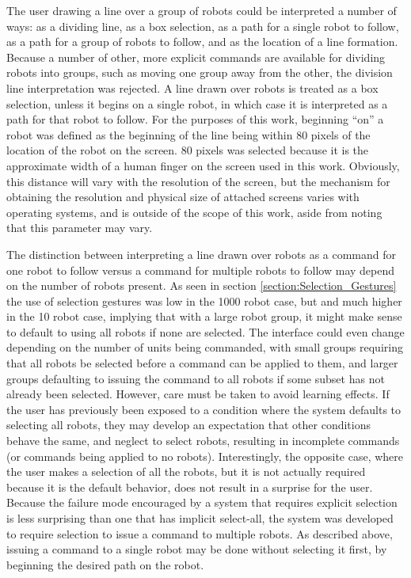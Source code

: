 The user drawing a line over a group of robots could be interpreted a number of ways: as a dividing line, as a box selection, as a path for a single robot to follow, as a path for a group of robots to follow, and as the location of a line formation. 
Because a number of other, more explicit commands are available for dividing robots into groups, such as moving one group away from the other, the division line interpretation was rejected. 
A line drawn over robots is treated as a box selection, unless it begins on a single robot, in which case it is interpreted as a path for that robot to follow. 
For the purposes of this work, beginning ``on'' a robot was defined as the beginning of the line being within 80 pixels of the location of the robot on the screen. 
80 pixels was selected because it is the approximate width of a human finger on the screen used in this work. 
Obviously, this distance will vary with the resolution of the screen, but the mechanism for obtaining the resolution and physical size of attached screens varies with operating systems, and is outside of the scope of this work, aside from noting that this parameter may vary.

The distinction between interpreting a line drawn over robots as a command for one robot to follow versus a command for multiple robots to follow may depend on the number of robots present.
As seen in section \ref{section:Selection_Gestures} the use of selection gestures was low in the 1000 robot case, but and much higher in the 10 robot case, implying that with a large robot group, it might make sense to default to using all robots if none are selected. 
The interface could even change depending on the number of units being commanded, with small groups requiring that all robots be selected before a command can be applied to them, and larger groups defaulting to issuing the command to all robots if some subset has not already been selected. 
However, care must be taken to avoid learning effects. 
If the user has previously been exposed to a condition where the system defaults to selecting all robots, they may develop an expectation that other conditions behave the same, and neglect to select robots, resulting in incomplete commands (or commands being applied to no robots). 
Interestingly, the opposite case, where the user makes a selection of all the robots, but it is not actually required because it is the default behavior, does not result in a surprise for the user. 
Because the failure mode encouraged by a system that requires explicit selection is less surprising than one that has implicit select-all, the system was developed to require selection to issue a command to multiple robots. 
As described above, issuing a command to a single robot may be done without selecting it first, by beginning the desired path on the robot. 

